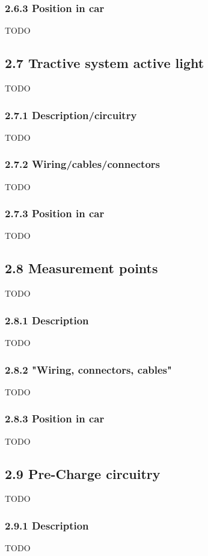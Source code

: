 \documentclass{article}
\begin{document}
\subsubsection*{2.6.3 Position in car}
TODO

\subsection*{2.7 Tractive system active light}
TODO

\subsubsection*{2.7.1 Description/circuitry}
TODO

\subsubsection*{2.7.2 Wiring/cables/connectors}
TODO

\subsubsection*{2.7.3 Position in car}
TODO

\subsection*{2.8 Measurement points}
TODO

\subsubsection*{2.8.1 Description}
TODO

\subsubsection*{2.8.2 "Wiring, connectors, cables"}
TODO

\subsubsection*{2.8.3 Position in car}
TODO

\subsection*{2.9 Pre-Charge circuitry}
TODO

\subsubsection*{2.9.1 Description}
TODO
\end{document}
